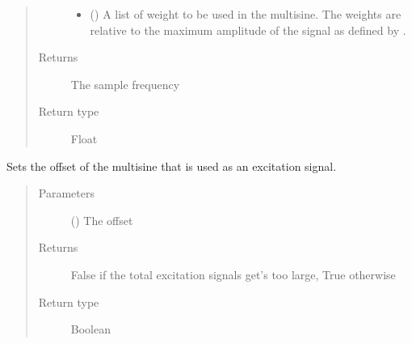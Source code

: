 \documentclass[letterpaper,10pt,english]{sphinxmanual}
\begin{document}
\begin{fulllineitems}
\begin{fulllineitems}
\begin{quote}
\begin{description}
\begin{itemize}
\item {} 
\sphinxAtStartPar
{} () \textendash{} A list of weight to be used in the multisine. The weights are relative to the maximum amplitude of the signal as defined by {\hyperref[\detokenize{index:TiePieLCR_settings.TiePieLCR_settings.set_amplitude}]{}}.

\end{itemize}

\item[{Returns}] \leavevmode
\sphinxAtStartPar
The sample frequency

\item[{Return type}] \leavevmode
\sphinxAtStartPar
Float

\end{description}\end{quote}

\end{fulllineitems}


\begin{fulllineitems}
\label{\detokenize{index:TiePieLCR_settings.TiePieLCR_settings.set_offset}}
\sphinxAtStartPar
Sets the offset of the multisine that is used as an excitation signal.
\begin{quote}\begin{description}
\item[{Parameters}] \leavevmode
\sphinxAtStartPar
{} () \textendash{} The offset

\item[{Returns}] \leavevmode
\sphinxAtStartPar
False if the total excitation signals get’s too large, True otherwise

\item[{Return type}] \leavevmode
\sphinxAtStartPar
Boolean

\end{description}\end{quote}

\end{fulllineitems}


\end{fulllineitems}
\end{document}
